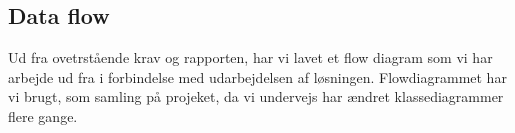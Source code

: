 
\subsection{Data flow}
Ud fra ovetrstående krav og rapporten, har vi lavet et flow diagram som vi har arbejde ud fra i forbindelse med udarbejdelsen af løsningen. Flowdiagrammet har vi brugt, som samling på projeket, da vi undervejs har ændret klassediagrammer flere gange. 
